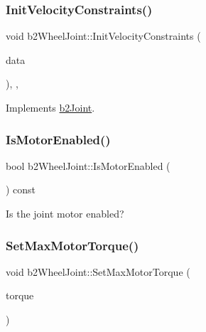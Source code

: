 \mbox{\label{classb2_wheel_joint_a557c58a58cdf75d5b2c14c7f75a37575}} 
\subsubsection{\texorpdfstring{InitVelocityConstraints()}{InitVelocityConstraints()}}
{\footnotesize\ttfamily void b2\+Wheel\+Joint\+::\+Init\+Velocity\+Constraints (\begin{DoxyParamCaption}\item[{const \mbox{\hyperlink{structb2_solver_data}{b2\+Solver\+Data}} \&}]{data }\end{DoxyParamCaption})\hspace{0.3cm}{\ttfamily [override]}, {\ttfamily [protected]}, {\ttfamily [virtual]}}



Implements \mbox{\hyperlink{classb2_joint_a599c013de5514e02684b958b31dd76a4}{b2\+Joint}}.

\mbox{\label{classb2_wheel_joint_aef7948a18ec2784397a1d3745824cd78}} 
\subsubsection{\texorpdfstring{IsMotorEnabled()}{IsMotorEnabled()}}
{\footnotesize\ttfamily bool b2\+Wheel\+Joint\+::\+Is\+Motor\+Enabled (\begin{DoxyParamCaption}{ }\end{DoxyParamCaption}) const}



Is the joint motor enabled? 

\mbox{\label{classb2_wheel_joint_a8aae3cd624ec9d48fc86c325c4595edc}} 
\subsubsection{\texorpdfstring{SetMaxMotorTorque()}{SetMaxMotorTorque()}}
{\footnotesize\ttfamily void b2\+Wheel\+Joint\+::\+Set\+Max\+Motor\+Torque (\begin{DoxyParamCaption}\item[{\mbox{\hyperlink{b2_settings_8h_aacdc525d6f7bddb3ae95d5c311bd06a1}{float32}}}]{torque }\end{DoxyParamCaption})}



